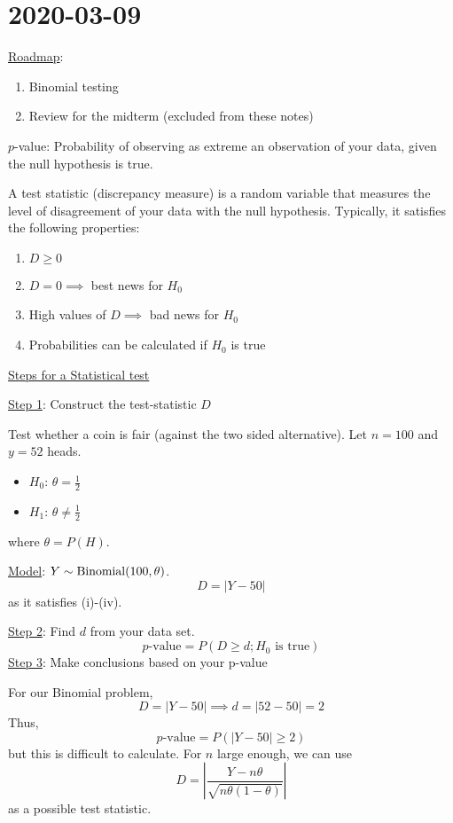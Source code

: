 \section{2020-03-09}
\underline{Roadmap}:
\begin{enumerate}[label=(\roman*)]
    \item Binomial testing
    \item Review for the midterm (excluded from these notes)
\end{enumerate}
\begin{defbox}
    \begin{definition}
        $ p $-value: Probability of observing as extreme an observation of your data,
        given the null hypothesis is true.
    \end{definition}
\end{defbox}

\begin{defbox}
    \begin{definition}
        A test statistic (discrepancy measure) is a random variable that measures
        the level of disagreement of your data with the null hypothesis. Typically,
        it satisfies the following properties:
        \begin{enumerate}[label=(\roman*)]
            \item $ D\geqslant 0 $
            \item $ D=0 \implies $ best news for $ H_0 $
            \item High values of $ D \implies $ bad news for $ H_0 $
            \item Probabilities can be calculated if $ H_0 $ is true
        \end{enumerate}
    \end{definition}
\end{defbox}

\underline{Steps for a Statistical test}

\underline{Step 1}: Construct the test-statistic $ D $
\begin{exbox}
    \begin{example}
        Test whether a coin is fair (against the two sided alternative).
        Let $ n=100 $ and $ y=52 $ heads.
        \begin{itemize}
            \item $ H_0 $: $ \theta=\frac{1}{2} $
            \item $ H_1 $: $ \theta\neq \frac{1}{2} $
        \end{itemize}
        where $ \theta=P(H) $.

        \underline{Model}: $ Y \sim \operatorname{Binomial}(100,\theta) $.
        \[ D=|Y-50| \]
        as it satisfies (i)-(iv).
    \end{example}
\end{exbox}
\underline{Step 2}: Find $ d $ from your data set.
\[ p\text{-value}=P(D\geqslant d;H_0\text{ is true}) \]
\underline{Step 3}: Make conclusions based on your p-value

For our Binomial problem,
\[ D=|Y-50|\implies d=|52-50|=2 \]
Thus,
\[ p\text{-value}=P(|Y-50|\geqslant 2) \]
but this is difficult to calculate. For $ n $ large enough, we can use
\[ D=\left| \frac{Y-n\theta}{\sqrt{n\theta(1-\theta)}} \right| \]
as a possible test statistic.
